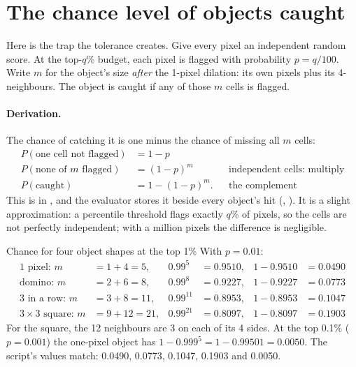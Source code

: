 \section{The chance level of objects caught}\label{sec:measures:chance}

Here is the trap the tolerance creates. Give every pixel an independent random score. At the top-$q$\% budget, each
pixel is flagged with probability $p = q/100$. Write $m$ for the object's size \emph{after} the 1-pixel dilation:
its own pixels plus its 4-neighbours. The object is caught if any of those $m$ cells is flagged.

\paragraph{Derivation.} The chance of catching it is one minus the chance of missing all $m$ cells:
\begin{align*}
P(\text{one cell not flagged}) &= 1 - p\\
P(\text{none of $m$ flagged}) &= (1 - p)^m && \text{independent cells: multiply}\\
P(\text{caught}) &= 1 - (1 - p)^m. && \text{the complement}
\end{align*}
This is  in , and the evaluator stores it beside every
object's hit (, ). It is a slight approximation: a percentile threshold flags
exactly $q$\% of pixels, so the cells are not perfectly independent; with a million pixels the difference is
negligible.

\begin{worked}[label={we:measures:chance}]{Chance for four object shapes at the top 1\%}
With $p = 0.01$:
\begin{align*}
\text{1 pixel: } m &= 1 + 4 = 5, & 0.99^5 &= 0.9510, & 1 - 0.9510 &= 0.0490\\
\text{domino: } m &= 2 + 6 = 8, & 0.99^8 &= 0.9227, & 1 - 0.9227 &= 0.0773\\
\text{3 in a row: } m &= 3 + 8 = 11, & 0.99^{11} &= 0.8953, & 1 - 0.8953 &= 0.1047\\
3 \times 3 \text{ square: } m &= 9 + 12 = 21, & 0.99^{21} &= 0.8097, & 1 - 0.8097 &= 0.1903
\end{align*}
For the square, the 12 neighbours are 3 on each of its 4 sides. At the top 0.1\% ($p = 0.001$) the one-pixel object
has $1 - 0.999^5 = 1 - 0.99501 = 0.0050$. The script's values match: 0.0490, 0.0773, 0.1047, 0.1903 and 0.0050\tagC{}.
\end{worked}

